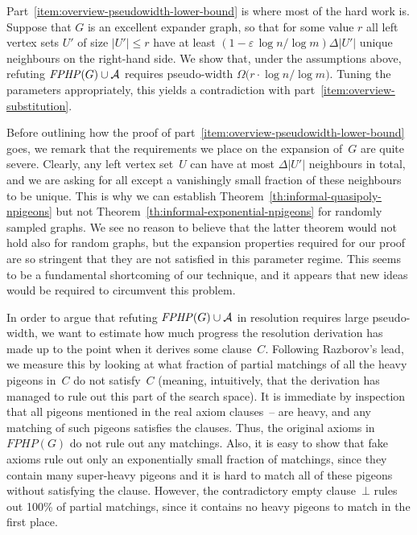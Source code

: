 \documentclass{theoretics}
\newcommand{\Bigomega}[1]{\Omega \bigl( #1 \bigr)}
\newcommand{\Setsize}[1]{\bigl\lvert#1\bigr\rvert}
\newcommand{\setsize}[1]{\lvert#1\rvert}
\newcommand{\union}{\cup}
\newcommand{\refth}[1]{Theorem~\ref{#1}}
\newcommand{\emptycl}{\bot}
\newcommand{\clc}{\ensuremath{C}}
\newcommand{\formulaformat}[1]{\mathit{#1}}
\newcommand{\graphfphpnot}[1][G]{\formulaformat{FPHP}({#1})}
\newcommand{\fakeaxiomintro}{fake axiom\xspace}
\newcommand{\heavy}{heavy\xspace}
\newcommand{\sheavy}{super-heavy\xspace}
\newcommand{\superheavy}{\sheavy}
\newcommand{\GFPHP}{G\text{-}FPHP}
\renewcommand{\GFPHP}{\graphfphpnot[G]}
\newcommand{\GdegMax}{\Delta}
\newcommand{\gdegmax}{\GdegMax}
\newcommand{\Ax}{\ensuremath\mathcal{A}}
\numberwithin{equation}{section}
\begin{document}
Part~\ref{item:overview-pseudowidth-lower-bound} is where most of the
hard work is.
Suppose that
$G$ is an excellent 
expander graph, so that for some value $r$ 
all left vertex sets $U'$ of size $\Setsize{U'} \leq r$
have at least
\mbox{$
(1 - \varepsilon\, {\log n}/{\log m})\gdegmax \setsize{U'}
$}
unique neighbours on the right-hand side.
We show that, under the assumptions above, refuting
$\GFPHP \union \Ax$
requires pseudo-width
$
\Bigomega{
  {r \cdot \log n} / {\log m}
}
$.
Tuning the parameters appropriately, this yields a contradiction with
part~\ref{item:overview-substitution}.

Before outlining how the proof of
part~\ref{item:overview-pseudowidth-lower-bound} goes,
we remark that the requirements we place on the expansion of~$G$ are
quite severe. Clearly, any left vertex set~$U$ can have at most
$\gdegmax \setsize{U'}$ neighbours in total, and we are asking for
all except a vanishingly small fraction of these neighbours to be
unique. This is why we can establish
\refth{th:informal-quasipoly-npigeons}  
but not
\refth{th:informal-exponential-npigeons}
for randomly sampled graphs. We see no reason to believe that the
latter theorem would not hold also for random graphs, 
but the expansion properties required for our
proof
are so stringent that they are not satisfied 
in this parameter regime.  This seems to be a fundamental
shortcoming of our technique, and it appears that new ideas would be
required to circumvent this problem.

In order to argue that refuting
$\GFPHP \union \Ax$
in resolution requires large pseudo-width, we
want to
estimate how much
progress the resolution derivation has made up to the point when it
derives some clause~$\clc$. Following Razborov's lead, we measure this
by looking at what fraction of partial matchings of all the \heavy
pigeons in~$\clc$ do not satisfy~$\clc$ (meaning, intuitively, that
the derivation has managed to rule out this part of the search space).
It is immediate by inspection that 
all pigeons mentioned in the
real
axiom clauses~--
are \heavy, 
and any matching of such pigeons satisfies the clauses. Thus, 
the original axioms in~$\GFPHP$ do not rule out any matchings.
Also, it is easy to show that \fakeaxiomintro{}s rule out only an
exponentially small fraction of matchings, since they contain many
\superheavy pigeons and it is hard to match all of these pigeons
without satisfying the clause.
However, the contradictory empty clause~$\emptycl$ rules out
100\% of partial matchings, since it contains no \heavy pigeons to
match in the first place.
\end{document}
